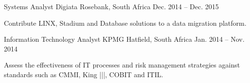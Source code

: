 \begin{cventries}
  \cventry
  {Systems Analyst} %
  {Digiata} %
  {Rosebank, South Africa} %
  {Dec. 2014 – Dec. 2015}%
  {
    \begin{cvitems} %
      \item {Contribute LINX, Stadium and Database solutions to a data migration platform.}
    \end{cvitems}
  }

  \cventry
  {Information Technology Analyst} %
  {KPMG} %
  {Hatfield, South Africa} %
  {Jan. 2014 – Nov. 2014} %
  {
    \begin{cvitems} %
      \item{Assess the effectiveness of IT processes and risk management strategies against standards such as CMMI, King |||, COBIT and ITIL.}
    \end{cvitems}
  }




\end{cventries}
